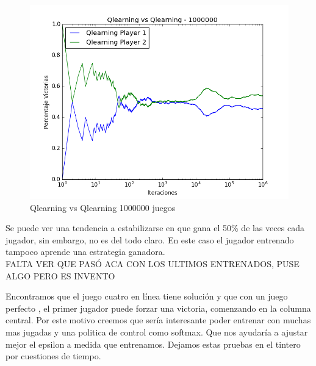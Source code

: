 \begin{figure}[h]
 \centering
 \begin{minipage}{.45\textwidth}
	\centering
	\includegraphics[scale=0.35]{resultados/7x6/QlearningVsQlearning_1000000_7x6_parametros_informe.png}
        \caption{Qlearning vs Qlearning 1000000 juegos}
  \end{minipage}
\end{figure}

Se puede ver una tendencia a estabilizarse en que gana el 50\% de las veces cada jugador, sin embargo, no es del todo claro. En este caso el jugador entrenado tampoco aprende una estrategia ganadora. \\

{\large FALTA VER QUE PASÓ ACA CON LOS ULTIMOS ENTRENADOS, PUSE ALGO PERO ES INVENTO}


Encontramos que el juego cuatro en línea tiene solución y que con un juego perfecto , el primer jugador puede forzar una victoria, comenzando en la columna central. Por este motivo creemos que sería interesante poder entrenar con muchas mas jugadas y una politica de control como softmax. Que nos ayudaría a ajustar mejor el epsilon a medida que entrenamos. Dejamos estas pruebas en el tintero por cuestiones de tiempo.





